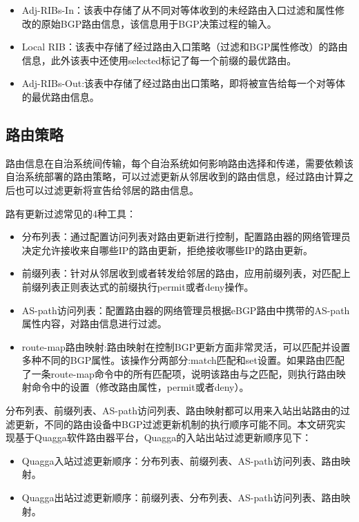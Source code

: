 \begin{itemize}
    \item Adj-RIBs-In：该表中存储了从不同对等体收到的未经路由入口过滤和属性修改的原始BGP路由信息，该信息用于BGP决策过程的输入。
    \item Local RIB：该表中存储了经过路由入口策略（过滤和BGP属性修改）的路由信息，此外该表中还使用selected标记了每一个前缀的最优路由。
    \item Adj-RIBs-Out:该表中存储了经过路由出口策略，即将被宣告给每一个对等体的最优路由信息。
\end{itemize}

\subsection{路由策略}
路由信息在自治系统间传输，每个自治系统如何影响路由选择和传递，需要依赖该自治系统部署的路由策略\cite{DianeTeare2016CCNP}，可以过滤更新从邻居收到的路由信息，经过路由计算之后也可以过滤更新将宣告给邻居的路由信息。

路有更新过滤常见的4种工具\cite{Kocharians2015CCIE}：
\begin{itemize}
    \item 分布列表：通过配置访问列表对路由更新进行控制，配置路由器的网络管理员决定允许接收来自哪些IP的路由更新，拒绝接收哪些IP的路由更新。
    \item 前缀列表：针对从邻居收到或者转发给邻居的路由，应用前缀列表，对匹配上前缀列表正则表达式的前缀执行permit或者deny操作。
    \item AS-path访问列表：配置路由器的网络管理员根据eBGP路由中携带的AS-path属性内容，对路由信息进行过滤。
    \item route-map路由映射:路由映射在控制BGP更新方面非常灵活，可以匹配并设置多种不同的BGP属性。该操作分两部分:match匹配和set设置。如果路由匹配了一条route-map命令中的所有匹配项，说明该路由与之匹配，则执行路由映射命令中的设置（修改路由属性，permit或者deny）。
\end{itemize}


分布列表、前缀列表、AS-path访问列表、路由映射都可以用来入站出站路由的过滤更新，不同的路由设备中BGP过滤更新机制的执行顺序可能不同。本文研究实现基于Quagga\cite{quagga}软件路由器平台，Quagga的入站出站过滤更新顺序见下：

\begin{itemize}
\item Quagga入站过滤更新顺序：分布列表、前缀列表、AS-path访问列表、路由映射。
\item Quagga出站过滤更新顺序：前缀列表、分布列表、AS-path访问列表、路由映射。
\end{itemize}

